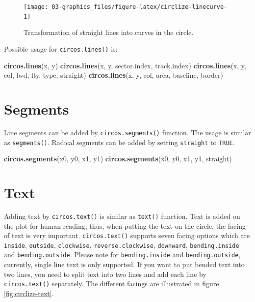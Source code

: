\documentclass[]{book}
\newenvironment{Shaded}{\begin{snugshade}}{\end{snugshade}}
\newcommand{\KeywordTok}[1]{\textcolor[rgb]{0.13,0.29,0.53}{\textbf{#1}}}
\newcommand{\NormalTok}[1]{#1}
\begin{document}
\begin{figure}

{\centering \texttt{[image: 03-graphics\_files/figure-latex/circlize-linecurve-1]} 

}

\caption{Transformation of straight lines into curves in the circle.}\label{fig:circlize-linecurve}
\end{figure}

Possible usage for \texttt{circos.lines()} is:

\begin{Shaded}
\begin{Highlighting}[]
\KeywordTok{circos.lines}\NormalTok{(x, y)}
\KeywordTok{circos.lines}\NormalTok{(x, y, sector.index, track.index)}
\KeywordTok{circos.lines}\NormalTok{(x, y, col, lwd, lty, type, straight)}
\KeywordTok{circos.lines}\NormalTok{(x, y, col, area, baseline, border)}
\end{Highlighting}
\end{Shaded}

\section{Segments}\label{segments}

Line segments can be added by \texttt{circos.segments()} function. The
usage is similar as \texttt{segments()}. Radical segments can be added
by setting \texttt{straight} to \texttt{TRUE}.

\begin{Shaded}
\begin{Highlighting}[]
\KeywordTok{circos.segments}\NormalTok{(x0, y0, x1, y1)}
\KeywordTok{circos.segments}\NormalTok{(x0, y0, x1, y1, straight)}
\end{Highlighting}
\end{Shaded}

\section{Text}\label{text}

Adding text by \texttt{circos.text()} is similar as \texttt{text()}
function. Text is added on the plot for human reading, thus, when
putting the text on the circle, the facing of text is very important.
\texttt{circos.text()} supports seven facing options which are
\texttt{inside}, \texttt{outside}, \texttt{clockwise},
\texttt{reverse.clockwise}, \texttt{downward}, \texttt{bending.inside}
and \texttt{bending.outside}. Please note for \texttt{bending.inside}
and \texttt{bending.outside}, currently, single line text is only
supported. If you want to put bended text into two lines, you need to
split text into two lines and add each line by \texttt{circos.text()}
separately. The different facings are illustrated in figure
\ref{fig:circlize-text}.
\end{document}
